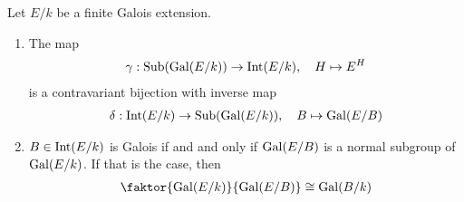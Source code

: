 \begin{thm} \label{thm:galois-correspondence}
  Let $E/k$ be a finite Galois extension.
  \begin{enumerate}
    \item The map
      \begin{align*}
        \gamma: \text{Sub}(\operatorname{Gal}(E/k)) \to \operatorname{Int}(E/k), \quad H \mapsto E^{H}
      \end{align*}
      is a contravariant bijection with inverse map
      \begin{align*}
        \delta: \operatorname{Int}(E/k) \to \text{Sub}(\operatorname{Gal}(E/k)), \quad B \mapsto \operatorname{Gal}(E/B)
      \end{align*}
    \item $B \in \operatorname{Int}(E/k)$ is Galois if and and only if $\operatorname{Gal}(E/B)$ is a normal subgroup of $\operatorname{Gal}(E/k)$.
      If that is the case, then
      \begin{align*}
        \faktor{\Gal(E/k)}{\Gal(E/B)} \iso \Gal(B/k)
      \end{align*}
  \end{enumerate}
\end{thm}

